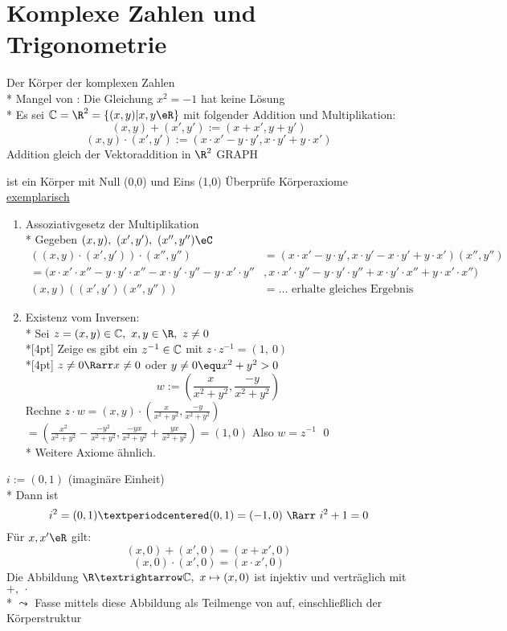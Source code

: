 \chapter{Komplexe Zahlen und Trigonometrie}
Der Körper \C{} der komplexen Zahlen\\*
Mangel von \R{}: Die Gleichung $x^2=-1$ hat keine Lösung\\*
Es sei $\C=\R^2=\{(x,y)|x,y\eR\}$ mit folgender Addition und Multiplikation:
$$(x,y)+(x',y'):=(x+x',y+y')$$
$$(x,y)·(x',y'):=(x·x'-y·y',x·y'+y·x')$$
Addition gleich der Vektoraddition in $\R^2$ GRAPH

\C{} ist ein Körper mit Null (0,0) und Eins (1,0)
\bew
Überprüfe Körperaxiome \ul{exemplarisch}
\begin{enumerate}
\item{Assoziativgesetz der Multiplikation\\*
Gegeben $(x,y),\ (x',y'),\ (x'',y'')\eC$
\begin{align*}
((x,y)·(x',y'))·(x'',y'')&=(x·x'-y·y',x·y'-x·y'+y·x')(x'',y'')\\
=(x·x'·x''-y·y'·x''-x·y'·y''-y·x'·y''&,x·x'·y''-y·y'·y''+x·y'·x''+y·x'·x'')\\
(x,y)((x',y')(x'',y''))&=…\text{ erhalte gleiches Ergebnis}
\end{align*}}
\item{Existenz vom Inversen:\\*
Sei $z = (x, y) \in \C, \ x, y \in \R, \ z \neq 0$ \\*[4pt]
Zeige es gibt ein $z^{-1} \in \text{$\mathbb{C}$}$ mit $z \cdot z^{-1} = (1,\ 0)$\\*[4pt]
$z \neq 0 \Rarr x \neq 0$ oder $y \neq 0 \equ x^2 + y^2 > 0$
$$w:= \left(\frac{x}{x^2 + y^2}, \frac{-y}{x^2 + y^2}\right)$$
Rechne $z \cdot w = (x, y) \cdot \left(\frac{x}{x^2 + y^2}, \frac{-y}{x^2 + y^2}\right)$
$=\left(\frac{x^2}{x^2 + y^2} - \frac{-y^2}{x^2 + y^2}, \frac{-yx}{x^2 + y^2} + \frac{yx}{x^2 + y^2}\right) = (1, 0)$
Also $w = z^{-1}$ \qed \\*
Weitere Axiome ähnlich.}
\end{enumerate}
$i:=(0,1)$ (imaginäre Einheit)\\*
Dann ist $$i^2=(0,1)·(0,1)=(-1,0)\ \Rarr\ i^2+1=0$$
\bem
Für $x,x'\eR$ gilt:
$$(x,0)+(x',0)=(x+x',0)$$
$$(x,0)·(x',0)=(x·x',0)$$
Die Abbildung $\R→\C,\ x\mapsto(x,0)$ ist injektiv und verträglich mit $+,\ ·$\\*
$\leadsto$ Fasse \R{} mittels diese Abbildung als Teilmenge von \C{} auf, einschließlich der Körperstruktur\\

